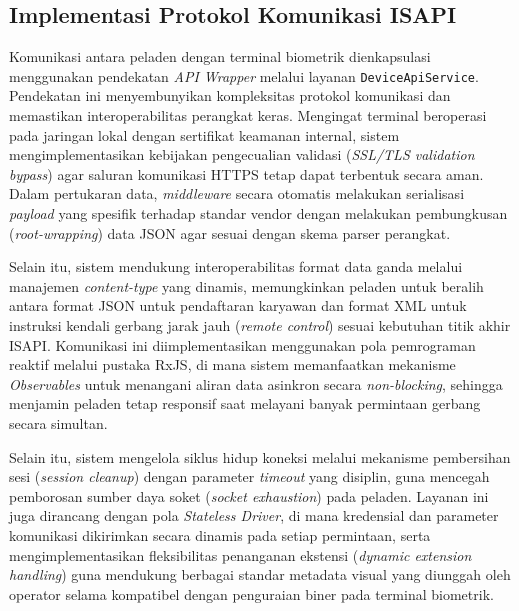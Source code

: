 \subsection{Implementasi Protokol Komunikasi ISAPI}
Komunikasi antara peladen dengan terminal biometrik dienkapsulasi menggunakan pendekatan \textit{API Wrapper} melalui layanan \texttt{DeviceApiService}. Pendekatan ini menyembunyikan kompleksitas protokol komunikasi dan memastikan interoperabilitas perangkat keras. Mengingat terminal beroperasi pada jaringan lokal dengan sertifikat keamanan internal, sistem mengimplementasikan kebijakan pengecualian validasi (\textit{SSL/TLS validation bypass}) agar saluran komunikasi HTTPS tetap dapat terbentuk secara aman. Dalam pertukaran data, \textit{middleware} secara otomatis melakukan serialisasi \textit{payload} yang spesifik terhadap standar vendor dengan melakukan pembungkusan (\textit{root-wrapping}) data JSON agar sesuai dengan skema parser perangkat. 

Selain itu, sistem mendukung interoperabilitas format data ganda melalui manajemen \textit{content-type} yang dinamis, memungkinkan peladen untuk beralih antara format JSON untuk pendaftaran karyawan dan format XML untuk instruksi kendali gerbang jarak jauh (\textit{remote control}) sesuai kebutuhan titik akhir ISAPI. Komunikasi ini diimplementasikan menggunakan pola pemrograman reaktif melalui pustaka RxJS, di mana sistem memanfaatkan mekanisme \textit{Observables} untuk menangani aliran data asinkron secara \textit{non-blocking}, sehingga menjamin peladen tetap responsif saat melayani banyak permintaan gerbang secara simultan. 

Selain itu, sistem mengelola siklus hidup koneksi melalui mekanisme pembersihan sesi (\textit{session cleanup}) dengan parameter \textit{timeout} yang disiplin, guna mencegah pemborosan sumber daya soket (\textit{socket exhaustion}) pada peladen. Layanan ini juga dirancang dengan pola \textit{Stateless Driver}, di mana kredensial dan parameter komunikasi dikirimkan secara dinamis pada setiap permintaan, serta mengimplementasikan fleksibilitas penanganan ekstensi (\textit{dynamic extension handling}) guna mendukung berbagai standar metadata visual yang diunggah oleh operator selama kompatibel dengan penguraian biner pada terminal biometrik.

